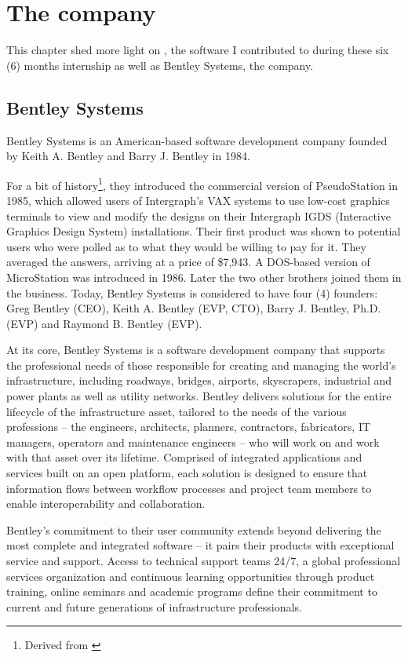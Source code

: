 \chapter{The company}
\label{ch:company}

This chapter shed more light on \CC, the software I contributed to during these six (6) months internship as well as Bentley Systems, the company.

\section{Bentley Systems}
Bentley Systems is an American-based software development company founded by Keith A. Bentley and Barry J. Bentley in 1984.

For a bit of history\footnote{Derived from \cite{bentley}}, they introduced the commercial version of PseudoStation in 1985, which allowed users of Intergraph's VAX systems to use low-cost graphics terminals to view and modify the designs on their Intergraph IGDS (Interactive Graphics Design System) installations. Their first product was shown to potential users who were polled as to what they would be willing to pay for it. They averaged the answers, arriving at a price of \$7,943. A DOS-based version of MicroStation was introduced in 1986. Later the two other brothers joined them in the business. Today, Bentley Systems is considered to have four (4) founders: Greg Bentley (CEO), Keith A. Bentley (EVP, CTO), Barry J. Bentley, Ph.D. (EVP) and Raymond B. Bentley (EVP).

At its core, Bentley Systems is a software development company that supports the professional needs of those responsible for creating and managing the world’s infrastructure, including roadways, bridges, airports, skyscrapers, industrial and power plants as well as utility networks.  Bentley delivers solutions for the entire lifecycle of the infrastructure asset, tailored to the needs of the various professions -- the engineers, architects, planners, contractors, fabricators, IT managers,
 operators and maintenance engineers -- who will work on and work with that asset over its lifetime. Comprised of integrated applications and services built on an open platform, each solution is designed to ensure that information flows between workflow processes and project team members to enable interoperability and collaboration.

Bentley’s commitment to their user community extends beyond delivering the most complete and integrated software -- it pairs their products with exceptional service and support. Access to technical support teams 24/7, a global professional services organization and continuous learning opportunities through product training, online seminars and academic programs define their commitment to current and future generations of infrastructure professionals.


